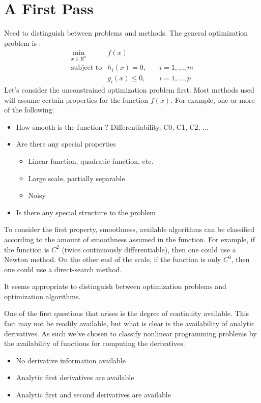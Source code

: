 \section{A First Pass}

Need to distinguish between problems and methods.
The general optimization problem is :
\begin{eqnarray}
\min_{x \in R^{n}} 	& f(x) 	& \\
\mbox{subject to} 		& h_i(x) = 0, & \quad i = 1, \ldots, m \nonumber\\
	 		& g_i(x) \leq 0, & \quad i = 1, \ldots, p \nonumber 
\end{eqnarray}
Let's consider the unconstrained optimization problem first. Most
methods used will assume certain properties for the function $f(x)$.
For example, one or more of the following:
\begin{itemize}
\item How smooth is the function ? Differentiability, C0, C1, C2, ...
\item Are there any special properties
\begin{itemize}
\item Linear function, quadratic function, etc.
\item Large scale, partially separable
\item Noisy
\end{itemize}
\item Is there any special structure to the problem
\end{itemize}

To consider the first property, smoothness, available algorithms can
be classified according to the amount of smoothness assumed in the
function. For example, if the function is $C^2$ (twice continuously
differentiable), then one could use a Newton method. On the other end
of the scale, if the function is only $C^0$, then one could use a
direct-search method.

It seems appropriate to distinguish between optimization problems and optimization algorithms.


One of the first questions that arises is the degree of continuity available.
This fact may not be readily available, but what is clear is the availability of analytic derivatives.  As such we've chosen to classify nonlinear programming problems by the availability of functions for computing the derivatives.

\begin{itemize}
\item No derivative information available
\item Analytic first derivatives are available
\item Analytic first and second derivatives are available
\end{itemize}

